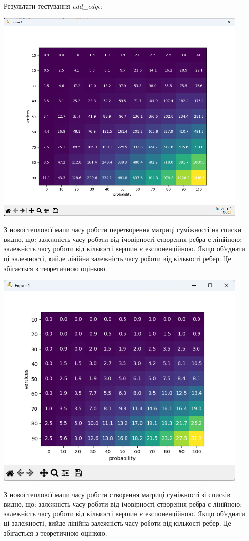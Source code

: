 \documentclass{article}
\begin{document}
Результати тестування \textit{add\_edge}:
\begin{center}
    \includegraphics[width=125mm]{newtoll}
\end{center}\indent

З нової теплової мапи часу роботи перетворення матриці суміжності на списки видно, що: залежність часу роботи від імовірності створення ребра є лінійною; залежність часу роботи від кількості вершин є експоненційною. Якщо об'єднати ці залежності, вийде лінійна залежність часу роботи від кількості ребер. Це збігається з теоретичною оцінкою.

\begin{center}
    \includegraphics[width=125mm]{newfromll}
\end{center}\indent

З нової теплової мапи часу роботи створення матриці суміжності зі списків видно, що: залежність часу роботи від імовірності створення ребра є лінійною; залежність часу роботи від кількості вершин є експоненційною. Якщо об'єднати ці залежності, вийде лінійна залежність часу роботи від кількості ребер. Це збігається з теоретичною оцінкою.
\end{document}
